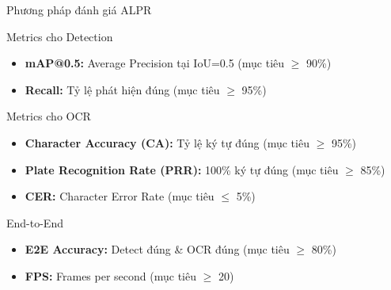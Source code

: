 \begin{frame}{Phương pháp đánh giá ALPR}
    \begin{block}{Metrics cho Detection}
    \begin{itemize}
        \item \textbf{mAP@0.5:} Average Precision tại IoU=0.5 (mục tiêu $\geq$ 90\%)
        \item \textbf{Recall:} Tỷ lệ phát hiện đúng (mục tiêu $\geq$ 95\%)
    \end{itemize}
    \end{block}
    
    \begin{block}{Metrics cho OCR}
    \begin{itemize}
        \item \textbf{Character Accuracy (CA):} Tỷ lệ ký tự đúng (mục tiêu $\geq$ 95\%)
        \item \textbf{Plate Recognition Rate (PRR):} 100\% ký tự đúng (mục tiêu $\geq$ 85\%)
        \item \textbf{CER:} Character Error Rate (mục tiêu $\leq$ 5\%)
    \end{itemize}
    \end{block}
    
    \begin{block}{End-to-End}
    \begin{itemize}
        \item \textbf{E2E Accuracy:} Detect đúng \& OCR đúng (mục tiêu $\geq$ 80\%)
        \item \textbf{FPS:} Frames per second (mục tiêu $\geq$ 20)
    \end{itemize}
    \end{block}
\end{frame}